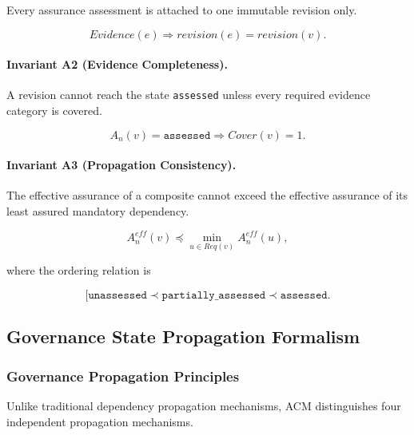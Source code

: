 \documentclass[10pt]{article}
\begin{document}
Every assurance assessment is attached to one immutable revision only.

\begin{equation}
	Evidence(e)
	\Longrightarrow
	revision(e)
	=
	revision(v).
	\label{eq:assurance_inv1}
\end{equation}

\paragraph{Invariant A2 (Evidence Completeness).}

A revision cannot reach the state
\texttt{assessed}
unless every required evidence category is covered.

\begin{equation}
	A_n(v)=\texttt{assessed}
	\Longrightarrow
	Cover(v)=1.
	\label{eq:assurance_inv2}
\end{equation}

\paragraph{Invariant A3 (Propagation Consistency).}

The effective assurance of a composite cannot exceed the effective assurance of
its least assured mandatory dependency.

\begin{equation}
	A_n^{eff}(v)
	\preceq
	\min_{u\in Req(v)}
	A_n^{eff}(u),
	\label{eq:assurance_inv3}
\end{equation}

where the ordering relation is

\begin{equation}[
\texttt{unassessed}
\prec
\texttt{partially\_assessed}
\prec
\texttt{assessed}.
\label{eq:assurance_hierarchy}
\end{equation}

\subsection{Governance State Propagation Formalism}
\label{appendix:state_propagation}
\subsubsection{Governance Propagation Principles}

Unlike traditional dependency propagation mechanisms, ACM distinguishes four
independent propagation mechanisms.
\end{document}
